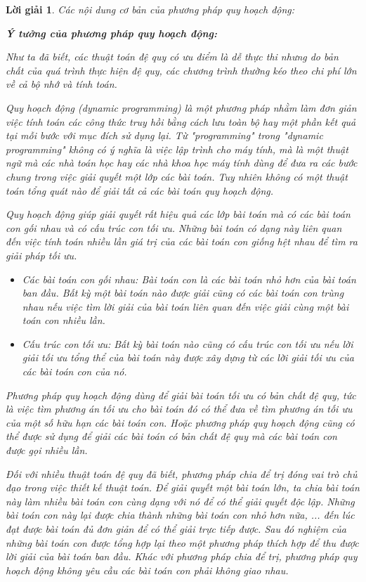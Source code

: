 \documentclass[14pt, a4paper]{article}
\theoremstyle{sltheorem}
\theoremstyle{soltheorem}
\newtheorem*{loigiai}{Lời giải}
\begin{document}
    \begin{loigiai}
        Các nội dung cơ bản của phương pháp quy hoạch động:

        \textbf{Ý tưởng của phương pháp quy hoạch động:}

        Như ta đã biết, các thuật toán đệ quy có ưu điểm là dễ thực thi nhưng do bản chất của quá trình thực hiện đệ quy,
        các chương trình thường kéo theo chi phí lớn về cả bộ nhớ và tính toán.

        Quy hoạch động (dynamic programming) là một phương pháp nhằm làm đơn giản việc tính toán các công thức truy hồi bằng cách lưu toàn bộ hay một phần kết quả tại mỗi bước với mục đích sử dụng lại.
        Từ "programming" trong "dynamic programming" không có ý nghĩa là việc lập trình cho máy tính,
        mà là một thuật ngữ mà các nhà toán học hay các nhà khoa học máy tính dùng để đưa ra các bước chung trong việc giải quyết một lớp các bài toán.
        Tuy nhiên không có một thuật toán tổng quát nào để giải tất cả các bài toán quy hoạch động.

        Quy hoạch động giúp giải quyết rất hiệu quả các lớp bài toán mà có các bài toán con gối nhau và có cấu trúc con tối ưu.
        Những bài toán có dạng này liên quan đến việc tính toán nhiều lần giá trị của các bài toán con giống hệt nhau để tìm ra giải pháp tối ưu.

        \begin{itemize}
            \item Các bài toán con gối nhau: Bài toán con là các bài toán nhỏ hơn của bài toán ban đầu.
            Bất kỳ một bài toán nào được giải cũng có các bài toán con trùng nhau nếu việc tìm lời giải của bài toán liên quan đến việc giải cùng một bài toán con nhiều lần.

            \item Cấu trúc con tối ưu: Bất kỳ bài toán nào cũng có cấu trúc con tối ưu nếu lời giải tối ưu tổng thể của bài toán này được xây dựng từ các lời giải tối ưu của các bài toán con của nó.
        \end{itemize}

        Phương pháp quy hoạch động dùng để giải bài toán tối ưu có bản chất đệ quy, tức là việc tìm
        phương án tối ưu cho bài toán đó có thể đưa về tìm phương án tối ưu của một số hữu hạn các bài toán con.
        Hoặc phương pháp quy hoạch động cũng có thể được sử dụng để giải các bài toán có bản chất đệ quy mà các bài toán con được gọi nhiều lần.

        Đối với nhiều thuật toán đệ quy đã biết, phương pháp chia để trị đóng vai trò chủ đạo trong việc thiết kế thuật toán.
        Để giải quyết một bài toán lớn, ta chia bài toán này làm nhiều bài toán con cùng dạng với nó để có thể giải quyết độc lập.
        Những bài toán con này lại được chia thành những bài toán con nhỏ hơn nữa, ... đến lúc đạt được bài toán đủ đơn giản để có thể giải trực tiếp được.
        Sau đó nghiệm của những bài toán con được tổng hợp lại theo một phương pháp thích hợp để thu được lời giải của bài toán ban đầu.
        Khác với phương pháp chia để trị, phương pháp quy hoạch động không yêu cầu các bài toán con phải không giao nhau.


\end{loigiai}
\end{document}
